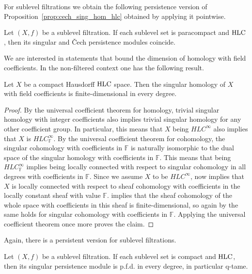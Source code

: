 For sublevel filtrations we obtain the following persistence version of Proposition~\ref{prop:cech_sing_hom_hlc} obtained by applying it pointwise.

\begin{cor}\label{cor:cech_sing_persistent_iso}
	Let $(X, f)$ be a sublevel filtration. If each sublevel set is paracompact and $\mathrm{HLC}$, then its singular and \v{C}ech persistence modules coincide.
\end{cor}

We are interested in statements that bound the dimension of homology with field coefficients.
In the non-filtered context one has the following result.

\begin{prop} \label{prop:fin_dim_sing_hom}
	Let $X$ be a compact Hausdorff $\mathrm{HLC}$ space.
	Then the singular homology of $X$ with field coefficients is finite-dimensional in every degree.
\end{prop}

\begin{proof}
	By the universal coefficient theorem for homology, trivial singular homology with integer coefficients also implies trivial singular homology for any other coefficient group. In particular, this means that $X$ being $HLC^{\infty}$ also implies that $X$ is $HLC^{\infty}_{\mathbb{F}}$. By the universal coefficient theorem for cohomology, the singular cohomology with coefficients in $\mathbb{F}$ is naturally isomorphic to the dual space of the singular homology with coefficients in $\mathbb{F}$. This means that being $HLC^{\infty}_{\mathbb{F}}$ implies being locally connected with respect to singular cohomology in all degrees with coefficients in $\mathbb{F}$. Since we assume $X$ to be $HLC^{\infty}$, \cite[Theorem III.1.1]{MR1481706} now implies that $X$ is locally connected with respect to sheaf cohomology with coefficients in the locally constant sheaf with value $\mathbb{F}$. \cite[Corollary II.17.7]{MR1481706} implies that the sheaf cohomology of the whole space with coefficients in this sheaf is finite-dimensional, so again by \cite[Theorem III.1.1]{MR1481706} the same holds for singular cohomology with coefficients in $\mathbb{F}$. Applying the universal coefficient theorem once more proves the claim.
\end{proof}

Again, there is a persistent version for sublevel filtrations.

\begin{cor}
	Let $(X, f)$ be a sublevel filtration. If each sublevel set is compact and $\mathrm{HLC}$, then its singular persistence module is p.f.d. in every degree, in particular q-tame.
\end{cor}

